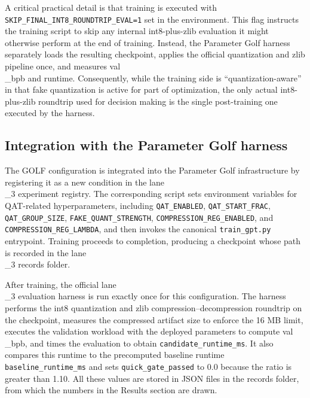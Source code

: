 \documentclass{article}
\begin{document}
A critical practical detail is that training is executed with \texttt{SKIP\_FINAL\_INT8\_ROUNDTRIP\_EVAL=1} set in the environment. This flag instructs the training script to skip any internal int8-plus-zlib evaluation it might otherwise perform at the end of training. Instead, the Parameter Golf harness separately loads the resulting checkpoint, applies the official quantization and zlib pipeline once, and measures val\\_bpb and runtime. Consequently, while the training side is ``quantization-aware'' in that fake quantization is active for part of optimization, the only actual int8-plus-zlib roundtrip used for decision making is the single post-training one executed by the harness.

\subsection{Integration with the Parameter Golf harness}

\label{sec:integration_with_the_parameter_golf_harn}

The GOLF configuration is integrated into the Parameter Golf infrastructure by registering it as a new condition in the lane\\_3 experiment registry. The corresponding script sets environment variables for QAT-related hyperparameters, including \texttt{QAT\_ENABLED}, \texttt{QAT\_START\_FRAC}, \texttt{QAT\_GROUP\_SIZE}, \texttt{FAKE\_QUANT\_STRENGTH}, \texttt{COMPRESSION\_REG\_ENABLED}, and \texttt{COMPRESSION\_REG\_LAMBDA}, and then invokes the canonical \texttt{train\_gpt.py} entrypoint. Training proceeds to completion, producing a checkpoint whose path is recorded in the lane\\_3 records folder.

After training, the official lane\\_3 evaluation harness is run exactly once for this configuration. The harness performs the int8 quantization and zlib compression--decompression roundtrip on the checkpoint, measures the compressed artifact size to enforce the 16 MB limit, executes the validation workload with the deployed parameters to compute val\\_bpb, and times the evaluation to obtain \texttt{candidate\_runtime\_ms}. It also compares this runtime to the precomputed baseline runtime \texttt{baseline\_runtime\_ms} and sets \texttt{quick\_gate\_passed} to 0.0 because the ratio is greater than 1.10. All these values are stored in JSON files in the records folder, from which the numbers in the Results section are drawn.
\end{document}
